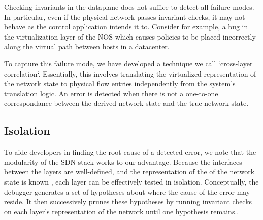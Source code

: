 Checking invariants in the dataplane does not suffice to detect all failure modes. In
particular, even if the physical network passes invariant checks, it may not behave as
the control application intends it to. Consider for example, a bug in the
virtualization layer of the NOS which causes policies to be placed
incorrectly along the virtual path between hosts in a datacenter.

To capture this failure mode, we have developed a technique we call `cross-layer
correlation`. Essentially, this involves translating the
virtualized representation of the network state to physical flow entries
independently from the system's translation logic. An error is detected when
there is not a one-to-one correspondance between the derived network
state and the true network state.


\subsection{Isolation}
\label{sec:isolation}

To aide developers in finding the root cause of a detected error, we note that
the modularity of the SDN stack works to our advantage. Because the interfaces
between the layers are well-defined, and the representation of the 
of the network state is known \apriori, each layer can be effectively tested in
isolation. Conceptually, the debugger generates a set of hypotheses about
where the cause of the error may reside. It then successively prunes these
hypotheses by running invariant checks on each layer's representation of the
network until one hypothesis remains..
